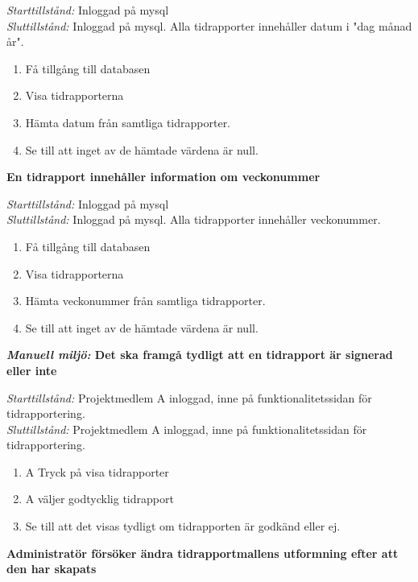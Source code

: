 \documentclass[a4paper]{article}
\begin{document}
\begin{FT}
\emph{Starttillstånd:} Inloggad på mysql\\
\emph{Sluttillstånd:} Inloggad på mysql. Alla tidrapporter innehåller datum i "dag månad år".\\

\begin{enumerate}
\item Få tillgång till databasen
\item Visa tidrapporterna
\item Hämta datum från samtliga tidrapporter.
\item Se till att inget av de hämtade värdena är null.
\end{enumerate}


\item
\textbf{En tidrapport innehåller information om veckonummer}

\emph{Starttillstånd:} Inloggad på mysql\\
\emph{Sluttillstånd:} Inloggad på mysql. Alla tidrapporter innehåller veckonummer.\\

\begin{enumerate}
\item Få tillgång till databasen
\item Visa tidrapporterna
\item Hämta veckonummer från samtliga tidrapporter.
\item Se till att inget av de hämtade värdena är null.
\end{enumerate}


\item
\textbf{\emph{Manuell miljö:} Det ska framgå tydligt att en tidrapport är signerad eller inte}

\emph{Starttillstånd:} Projektmedlem A inloggad, inne på funktionalitetssidan för tidrapportering.\\
\emph{Sluttillstånd:} Projektmedlem A inloggad, inne på funktionalitetssidan för tidrapportering.

\begin{enumerate}
\item A Tryck på visa tidrapporter
\item A väljer godtycklig tidrapport
\item Se till att det visas tydligt om tidrapporten är godkänd eller ej.
\end{enumerate}


\item
\textbf{Administratör försöker ändra tidrapportmallens utformning efter att den har
skapats}


\end{FT}
\end{document}
